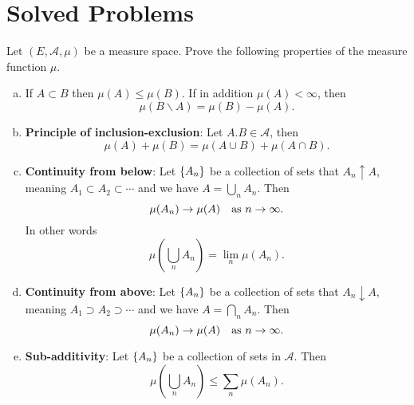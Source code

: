 \section{Solved Problems}

\begin{problem}
	Let $ (E, \mathcal{A}, \mu) $ be a measure space. Prove the following properties of the measure function $ \mu $.
	\begin{enumerate}[(a)]
		\item If $ A\subset B $ then $ \mu(A) \leq \mu(B) $. If in addition $ \mu(A) < \infty $, then
		\[ \mu(B\backslash A) = \mu(B) - \mu(A). \]
		\item \textbf{Principle of inclusion-exclusion}: Let $ A.B \in \mathcal{A} $, then
		\[ \mu(A) + \mu(B) = \mu(A\cup B) + \mu (A\cap B). \]
		\item \textbf{Continuity from below}: Let $ \{A_n\} $ be a collection of sets that $ A_n \uparrow A $, meaning $ A_1\subset A_2 \subset\cdots $ and we have $ A = \bigcup_n A_n $. Then
		\[ \mu(A_n) \to \mu(A) \quad \text{as $ n\to\infty $}. \]
		In other words
		\[ \mu(\bigcup_n A_n) = \lim_n \mu(A_n). \]
		\item \textbf{Continuity from above}: Let $ \{A_n\} $ be a collection of sets that $ A_n \downarrow A $, meaning $ A_1 \supset A_2 \supset \cdots $ and we have $ A = \bigcap_n A_n $. Then
		\[ \mu(A_n) \to \mu(A) \quad \text{as $ n\to\infty $}. \]
		\item \textbf{Sub-additivity}: Let $ \{A_n\} $ be a collection of sets in $ \mathcal{A} $. Then
		\[ \mu(\bigcup_n A_n) \leq \sum_n \mu(A_n). \]
	\end{enumerate}
\end{problem}
